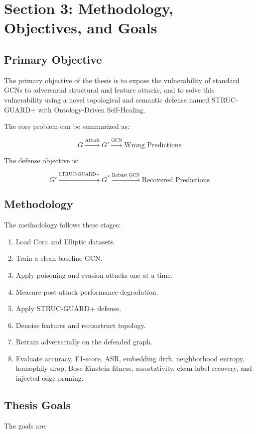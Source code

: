 \documentclass[12pt,a4paper]{article}
\begin{document}
\section{Section 3: Methodology, Objectives, and Goals}

\subsection{Primary Objective}
The primary objective of the thesis is to expose the vulnerability of standard GCNs to adversarial structural and feature attacks, and to solve this vulnerability using a novel topological and semantic defense named STRUC-GUARD+ with Ontology-Driven Self-Healing.

The core problem can be summarized as:

$$
G \xrightarrow{\text{Attack}} G' \xrightarrow{\text{GCN}} \text{Wrong Predictions}
$$

The defense objective is:

$$
G' \xrightarrow{\text{STRUC-GUARD+}} G^* \xrightarrow{\text{Robust GCN}} \text{Recovered Predictions}
$$

\subsection{Methodology}
The methodology follows these stages:

\begin{enumerate}
    \item Load Cora and Elliptic datasets.
    \item Train a clean baseline GCN.
    \item Apply poisoning and evasion attacks one at a time.
    \item Measure post-attack performance degradation.
    \item Apply STRUC-GUARD+ defense.
    \item Denoise features and reconstruct topology.
    \item Retrain adversarially on the defended graph.
    \item Evaluate accuracy, F1-score, ASR, embedding drift, neighborhood entropy, homophily drop, Bose-Einstein fitness, assortativity, clean-label recovery, and injected-edge pruning.
\end{enumerate}

\subsection{Thesis Goals}
The goals are:
\end{document}
